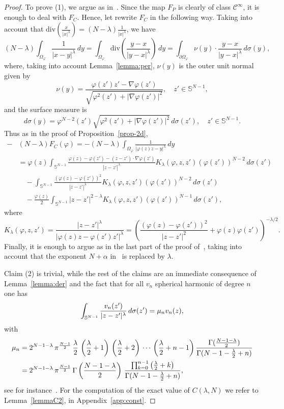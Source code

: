 \documentclass[10pt,reqno,english]{amsart}
\newcommand{\Sn}{\mathbb{S}^{N-1}}
\theoremstyle{definition}
\numberwithin{equation}{section}
\begin{document}
\begin{proof}
To prove (1), we argue as in~\cite[Proposition 7]{Fr19}. Since the map $F_P$ is clearly of class $\mathcal C^\infty$, it is enough to deal with $F_C$. Hence, let rewrite $F_C$ in the following way. Taking into account that $\mathrm{div}\left(\frac{x}{|x|^\lambda}\right)=(N-\lambda)\frac{1}{|x|^\lambda}$, we have
\[
(N-\lambda)\int_{\Omega_\varphi}\frac{1}{|x-y|^\lambda}\,dy=\int_{\Omega_\varphi}\mathrm{div}\left(\frac{y-x}{|y-x|^\lambda}\right)\,dy=\int_{\partial\Omega_\varphi}\nu(y)\cdot\frac{y-x}{|y-x|^\lambda}\,d\sigma(y),
\]
where, taking into account Lemma~\ref{lemma:per}, $\nu(y)$ is the outer unit normal given by
\[
\nu(y)=\frac{\varphi(z')z'-\nabla\varphi(z')}{ \sqrt{\varphi^2(z') + |\nabla \varphi(z') |^2} },\quad z'\in\Sn,
\]
and the surface measure is
\[
d\sigma(y)= \varphi^{N-2}(z') \sqrt{\varphi^2(z') + |\nabla \varphi(z') |^2} \, d\sigma(z'),\quad z'\in\Sn.
\]
Thus as in the proof of Proposition~\ref{prop-2d},
\begin{align*}
-&(N-\lambda)F_C(\varphi)=-(N-\lambda)\int_{\Omega_\varphi}\frac{1}{|\varphi(z)z-y|^\lambda}\,dy\\
&=\varphi(z)\int_{\Sn}\frac{\varphi(z)-\varphi(z')-(z-z')\cdot\nabla \varphi(z')}{|z-z'|^\lambda}K_\lambda(\varphi,z,z')(\varphi(z'))^{N-2}\,d\sigma(z')\\
&\quad-\int_{\Sn}\frac{(\varphi(z)-\varphi(z'))^2}{|z-z'|^\lambda}K_\lambda(\varphi,z,z')(\varphi(z'))^{N-2}\,d\sigma(z')\\
&\quad-\frac{\varphi(z)}{2}\int_{\Sn}|z-z'|^{2-\lambda}K_\lambda(\varphi,z,z')(\varphi(z'))^{N-1}\,d\sigma(z'),
\end{align*}
where
\[
K_\lambda(\varphi,z,z')=\frac{|z-z'|^\lambda}{|\varphi(z)z-\varphi(z')z'|^\lambda}=\left(\frac{(\varphi(z)-\varphi(z'))^2}{|z-z'|^2}+\varphi(z)\varphi(z')\right)^{-\lambda/2}.
\]
 Finally, it is enough to argue as in the last part of the proof of~\cite[Proposition 7]{Fr19}, taking into account that the exponent $N+\alpha$ in~\cite[equation (4.17)]{CFW} is replaced by $\lambda$.

Claim (2) is trivial, while the rest of the claims are an immediate consequence of Lemma~\ref{lemma:der} and the fact that for all $v_n$ spherical harmonic of degree $n$ one has
\[
\int_{\mathbb S^{N-1}} {v_n(z') \over |z-z'|^\lambda } \,d\sigma(z')= \mu_n v_n(z), 
\]
with
\begin{align*}
 \mu_n& = 2^{N-1-\lambda} \, \pi^{N-1 \over 2} \, {\lambda \over 2} \, \left( {\lambda \over 2} +1\right) \, \left( {\lambda \over 2} +2 \right) \, \cdots \, \left( {\lambda \over 2}  + n -1\right) \frac{\Gamma ({N-1-\lambda \over 2})} {\Gamma (N-1 -{\lambda \over 2} + n)}\\
 &=  2^{N-1-\lambda} \, \pi^{N-1 \over 2}\,\Gamma \left({N-1-\lambda \over 2}\right)\,\frac{\prod_{k=0}^{n-1}\left(\frac\lambda2+k\right)} {\Gamma (N-1 -{\lambda \over 2} + n)},
\end{align*}
 see for instance~\cite[formulas (13) and (17)]{HAZ12}. For the computation of the exact value of $C (\lambda, N)$ we refer to Lemma~\ref{lemmaC2}, in Appendix~\ref{app:const}.
\end{proof}
\end{document}
